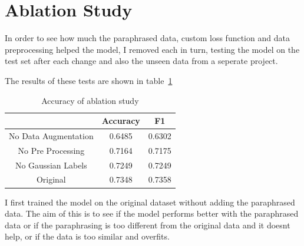 \documentclass{UoYCSproject}
\begin{document}
    \section{Ablation Study}
    In order to see how much the paraphrased data, custom loss function and data preprocessing helped the model, I removed each in turn, testing the model on the test set after each change and also the unseen data from a seperate project.

    The results of these tests are shown in table~\ref{tab:accuracy-ablation} \par

\begin{table}[h]
\centering
\begin{tabular}{ccc}
    \toprule

                     & Accuracy   & F1         \\
    \midrule
No Data Augmentation & 0.6485 & 0.6302 \\
No Pre Processing    & 0.7164 & 0.7175 \\
No Gaussian Labels   & 0.7249 & 0.7249 \\
Original             & 0.7348  & 0.7358 \\
    \bottomrule
\end{tabular}
    \caption{Accuracy of ablation study} \label{tab:accuracy-ablation}

\end{table}

    I first trained the model on the original dataset without adding the paraphrased data. The aim of this is to see if the model performs better with the paraphrased data or if the paraphrasing is too different from the original data and it doesnt help, or if the data is too similar and overfits.
\end{document}
